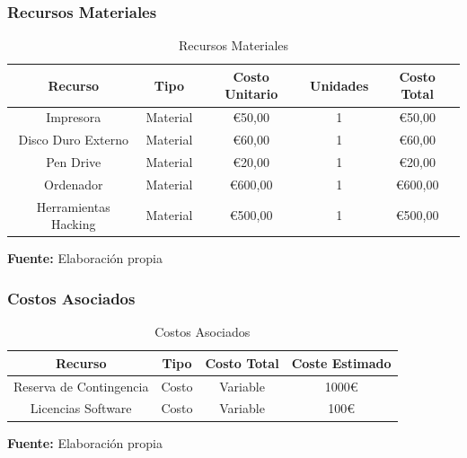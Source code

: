 \documentclass[a4paper, 10pt]{article}
\begin{document}
\subsubsection{Recursos Materiales}
\begin{table}[H]
\caption{Recursos Materiales}
\centering
\renewcommand{\arraystretch}{1.5}
\begin{tabular}{|c|c|c|c|c|}
\hline
\textbf{Recurso} & \textbf{Tipo} & \textbf{Costo Unitario} & \textbf{Unidades} & \textbf{Costo Total}  \\ \hline
Impresora & Material & €50,00 & 1& €50,00  \\ \hline
Disco Duro Externo & Material &  €60,00 &1& €60,00  \\ \hline
Pen Drive & Material & €20,00 & 1& €20,00  \\ \hline
Ordenador & Material & €600,00 & 1& €600,00  \\ \hline
Herramientas Hacking & Material & €500,00 & 1& €500,00  \\ \hline
\end{tabular}
\begin{flushleft}\centering
    \footnotesize \textbf{Fuente:} Elaboración propia
\end{flushleft}   
\label{tab:recursos_materiales}
\end{table}



\subsubsection{Costos Asociados}

\begin{table}[H]
\caption{Costos Asociados}
\centering
\renewcommand{\arraystretch}{1.5}
\begin{tabular}{|c|c|c|c|}
\hline
\textbf{Recurso} & \textbf{Tipo} & \textbf{Costo Total} & \textbf{Coste Estimado}  \\ \hline
Reserva de Contingencia & Costo & Variable & 1000€  \\ \hline
Licencias Software & Costo & Variable &  100€ \\ \hline
\end{tabular}
\begin{flushleft}\centering
    \footnotesize \textbf{Fuente:} Elaboración propia
\end{flushleft}   
\label{tab:costos_asociados}
\end{table}
\end{document}
